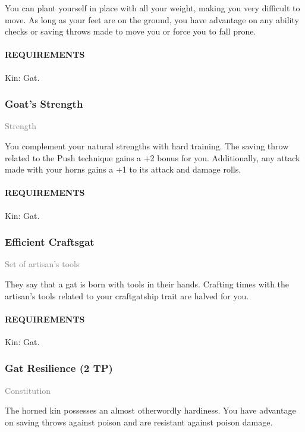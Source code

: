     \normalsize
    You can plant yourself in place with all your weight, making you very difficult to move.
    As long as your feet are on the ground, you have advantage on any ability checks or saving throws made to move you or force you to fall prone.
    \paragraph{REQUIREMENTS} Kin: Gat.

    \subsubsection{Goat's Strength} \label{tal::goatsstrength}
    \small{\textcolor{gray}{Strength}}

    \normalsize
    You complement your natural strengths with hard training.
    The saving throw related to the Push technique gains a +2 bonus for you.
    Additionally, any attack made with your horns gains a +1 to its attack and damage rolls.
    \paragraph{REQUIREMENTS} Kin: Gat.

    \subsubsection{Efficient Craftsgat} \label{tal::efficientcraftsgat}
    \small{\textcolor{gray}{Set of artisan's tools}}

    \normalsize
    They say that a gat is born with tools in their hands.
    Crafting times with the artisan's tools related to your craftgatship trait are halved for you.
    \paragraph{REQUIREMENTS} Kin: Gat.

    \subsubsection{Gat Resilience (2 TP)} \label{tal::gatresilience}
    \small{\textcolor{gray}{Constitution}}

    \normalsize
    The horned kin possesses an almost otherwordly hardiness.
    You have advantage on saving throws against poison and are resistant against poison damage.
